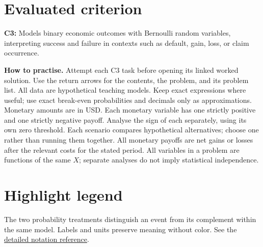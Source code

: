 
\maketitle
\setcounter{tocdepth}{1}
\setcounter{secnumdepth}{2}
\label{toc}
\tableofcontents
\section*{Evaluated criterion}
\textbf{C3:} Models binary economic outcomes with Bernoulli random variables, interpreting success and failure in contexts such as default, gain, loss, or claim occurrence.

\textbf{How to practise.} Attempt each C3 task before opening its linked worked solution.
Use the return arrows for the contents, the problem, and its problem list.
All data are hypothetical teaching models. Keep exact expressions where useful;
use exact break-even probabilities and decimals only as approximations. Monetary amounts are in USD.
Each monetary variable has one strictly positive and one strictly negative payoff.
Analyse the sign of each  separately, using its own zero threshold.
Each scenario compares hypothetical alternatives; choose one rather than running them together.
All monetary payoffs are net gains or losses after the relevant costs for the stated period.
All variables in a problem are functions of the same $X$; separate analyses do
not imply statistical independence.


\clearpage\section*{Highlight legend}
\label{tab:highlight-legend}

The two probability treatments distinguish an event from its complement within
the same model. Labels and units preserve meaning without color.
See the \hyperref[tab:notation-reference]{detailed notation reference}.

